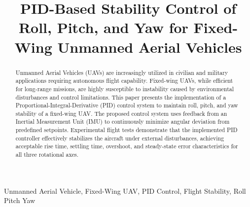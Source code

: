 \documentclass[conference]{IEEEtran}
\begin{document}
\title{PID-Based Stability Control of Roll, Pitch, and Yaw for Fixed-Wing Unmanned Aerial Vehicles}

\author{
\and
{}
}

\maketitle

\begin{abstract}
Unmanned Aerial Vehicles (UAVs) are increasingly utilized in civilian and military applications requiring autonomous flight capability. Fixed-wing UAVs, while efficient for long-range missions, are highly susceptible to instability caused by environmental disturbances and control limitations. This paper presents the implementation of a Proportional-Integral-Derivative (PID) control system to maintain roll, pitch, and yaw stability of a fixed-wing UAV. The proposed control system uses feedback from an Inertial Measurement Unit (IMU) to continuously minimize angular deviation from predefined setpoints. Experimental flight tests demonstrate that the implemented PID controller effectively stabilizes the aircraft under external disturbances, achieving acceptable rise time, settling time, overshoot, and steady-state error characteristics for all three rotational axes.
\end{abstract}

\begin{IEEEkeywords}
Unmanned Aerial Vehicle, Fixed-Wing UAV, PID Control, Flight Stability, Roll Pitch Yaw
\end{IEEEkeywords}

\end{document}
